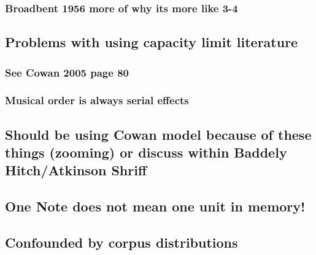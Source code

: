 \documentclass[]{book}
\theoremstyle{definition}
\theoremstyle{definition}
\theoremstyle{definition}
\theoremstyle{remark}
\begin{document}
\hypertarget{broadbent-1956-more-of-why-its-more-like-3-4}{%
\subsubsection{Broadbent 1956 more of why its more like
3-4}\label{broadbent-1956-more-of-why-its-more-like-3-4}}

\hypertarget{problems-with-using-capacity-limit-literature}{%
\subsection{Problems with using capacity limit
literature}\label{problems-with-using-capacity-limit-literature}}

\hypertarget{see-cowan-2005-page-80}{%
\subsubsection{See Cowan 2005 page 80}\label{see-cowan-2005-page-80}}

\hypertarget{musical-order-is-always-serial-effects}{%
\subsubsection{Musical order is always serial
effects}\label{musical-order-is-always-serial-effects}}

\hypertarget{should-be-using-cowan-model-because-of-these-things-zooming-or-discuss-within-baddely-hitchatkinson-shriff}{%
\subsection{Should be using Cowan model because of these things
(zooming) or discuss within Baddely Hitch/Atkinson
Shriff}\label{should-be-using-cowan-model-because-of-these-things-zooming-or-discuss-within-baddely-hitchatkinson-shriff}}

\hypertarget{one-note-does-not-mean-one-unit-in-memory}{%
\subsection{One Note does not mean one unit in
memory!}\label{one-note-does-not-mean-one-unit-in-memory}}

\hypertarget{confounded-by-corpus-distributions}{%
\subsection{Confounded by corpus
distributions}\label{confounded-by-corpus-distributions}}
\end{document}

